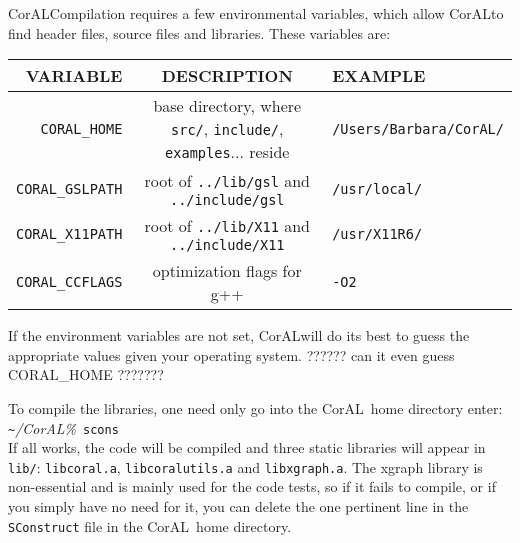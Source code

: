 \documentclass[10pt]{article}
\newcommand{\coral}{CorAL}
\begin{document}
\coral Compilation requires a few environmental variables, which allow \coral to find header files, source files and libraries. These variables are:\vspace*{-8pt}
\begin{center}
\begin{tabular}{|r|c|l|} \hline
VARIABLE & DESCRIPTION & EXAMPLE \\ \hline
{\tt CORAL\_HOME} & base directory, where {\tt src/}, {\tt include/}, {\tt examples}... reside & {\tt /Users/Barbara/CorAL/} \\ \hline
{\tt CORAL\_GSLPATH}& root of {\tt ../lib/gsl} and {\tt ../include/gsl} & {\tt /usr/local/} \\ \hline
{\tt CORAL\_X11PATH}& root of {\tt ../lib/X11} and {\tt ../include/X11} & {\tt /usr/X11R6/} \\ \hline
{\tt CORAL\_CCFLAGS} & optimization flags for g++ & {\tt -O2} \\ \hline
\end{tabular}
\end{center}
\vspace*{-8pt}
\noindent
If the environment variables are not set, \coral will do its best to guess the appropriate values given your operating system. ?????? can it even guess CORAL\_HOME ???????

To compile the libraries, one need only go into the \coral ~home directory enter:\\
\verb!~!{\sl /CorAL\%}~{\tt scons}\\
If all works, the code will be compiled and three static libraries will appear in {\tt lib/}: {\tt libcoral.a}, {\tt libcoralutils.a} and {\tt libxgraph.a}. The xgraph library is non-essential and is mainly used for the code tests, so if it fails to compile, or if you simply have no need for it, you can delete the one pertinent line in the {\tt SConstruct} file in the \coral ~home directory. 
\end{document}
